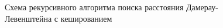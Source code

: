 \begin{figure}[h!]
	
		
		\caption{Схема рекурсивного алгоритма поиска расстояния Дамерау-Левенштейна с кешированием}
		
		\label{fig:dleven_rec_cash2}
		
	\end{figure}

